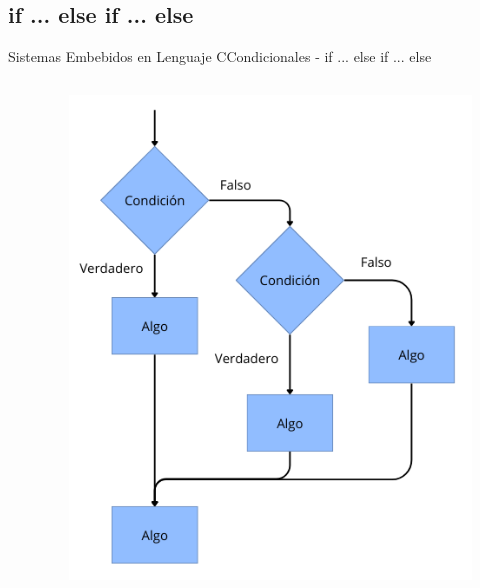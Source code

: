 \documentclass[aspectratio=169, xcolor=dvipsnames]{beamer}
\begin{document}
\subsection{if ... else if ... else}
\begin{frame}{Sistemas Embebidos en Lenguaje C}{Condicionales - if ... else if ... else}
\begin{columns}
    \begin{column}{0.5\textwidth}
        
    \end{column}
    \begin{column}{0.5\textwidth}
        \begin{figure}
            \centering
            \includegraphics[width=0.75\linewidth]{resources/images/if_else_if_else.png}
        \end{figure}
    \end{column}
\end{columns}
\end{frame}
\end{document}
